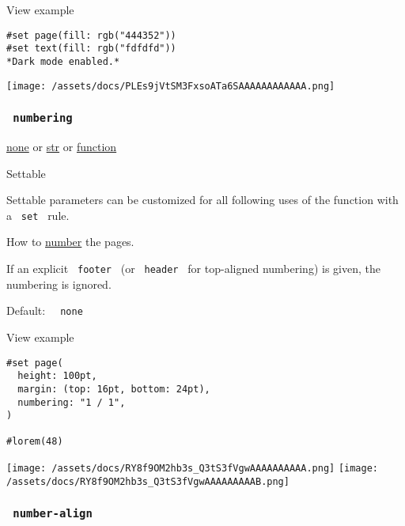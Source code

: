 
View example

\begin{verbatim}
#set page(fill: rgb("444352"))
#set text(fill: rgb("fdfdfd"))
*Dark mode enabled.*
\end{verbatim}

\texttt{[image: /assets/docs/PLEs9jVtSM3FxsoATa6SAAAAAAAAAAAA.png]}

\subsubsection{\texorpdfstring{\texttt{\ numbering\ }}{ numbering }}\label{parameters-numbering}

\href{/docs/reference/foundations/none/}{none} {or}
\href{/docs/reference/foundations/str/}{str} {or}
\href{/docs/reference/foundations/function/}{function}

{{ Settable }}

\label{parameters-numbering-settable-tooltip}
Settable parameters can be customized for all following uses of the
function with a \texttt{\ set\ } rule.

How to \href{/docs/reference/model/numbering/}{number} the pages.

If an explicit \texttt{\ footer\ } (or \texttt{\ header\ } for
top-aligned numbering) is given, the numbering is ignored.

Default: \texttt{\ }{\texttt{\ none\ }}\texttt{\ }


View example

\begin{verbatim}
#set page(
  height: 100pt,
  margin: (top: 16pt, bottom: 24pt),
  numbering: "1 / 1",
)

#lorem(48)
\end{verbatim}

\texttt{[image: /assets/docs/RY8f9OM2hb3s\_Q3tS3fVgwAAAAAAAAAA.png]}
\texttt{[image: /assets/docs/RY8f9OM2hb3s\_Q3tS3fVgwAAAAAAAAAB.png]}

\subsubsection{\texorpdfstring{\texttt{\ number-align\ }}{ number-align }}\label{parameters-number-align}

